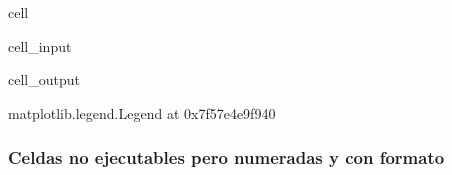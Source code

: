 \documentclass[letterpaper,10pt,english]{jupyterBook}
\begin{document}
\begin{sphinxuseclass}{cell}
\begin{sphinxVerbatimInput}
\begin{sphinxuseclass}{cell_input}
\begin{sphinxVerbatim}[commandchars=\\\{\}]
    
  
 \PYG{p}{[}  \PYG{p}{]}
\end{sphinxVerbatim}

\end{sphinxuseclass}\end{sphinxVerbatimInput}
\begin{sphinxVerbatimOutput}

\begin{sphinxuseclass}{cell_output}
\begin{sphinxVerbatim}[commandchars=\\\{\}]
\PYGZlt{}matplotlib.legend.Legend at 0x7f57e4e9f940\PYGZgt{}
\end{sphinxVerbatim}

\noindent{}

\end{sphinxuseclass}\end{sphinxVerbatimOutput}

\end{sphinxuseclass}

\subsubsection{Celdas no ejecutables pero numeradas y con formato}
\label{\detokenize{docs/01_01_Code_Blocks:celdas-no-ejecutables-pero-numeradas-y-con-formato}}
\def\sphinxLiteralBlockLabel{\label{\detokenize{docs/01_01_Code_Blocks:label-codeblock}}}
%
\begin{sphinxVerbatim}[commandchars=\\\{\},numbers=left,firstnumber=10,stepnumber=1]
  
\end{sphinxVerbatim}
\sphinxresetverbatimhllines
\end{document}
